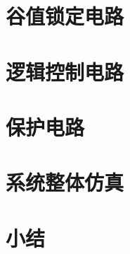 
























\section{谷值锁定电路}



\section{逻辑控制电路}

\section{保护电路}

\section{系统整体仿真}

\section{小结}




